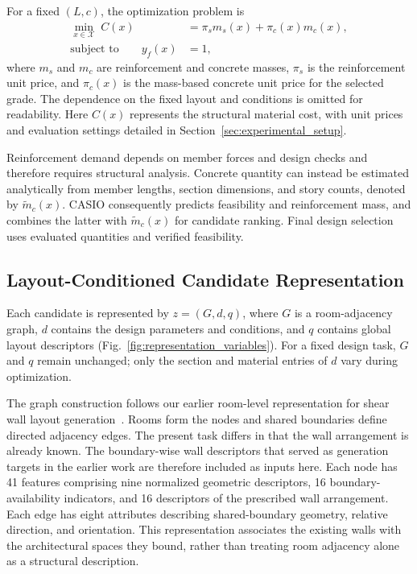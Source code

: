 For a fixed $(L,c)$, the optimization problem is
\begin{equation}
\begin{aligned}
\min_{x\in\mathcal{X}}\; C(x)&=\pi_s m_s(x)+\pi_c(x)m_c(x),\\
\text{subject to}\qquad y_f(x)&=1,
\end{aligned}
\label{eq:optimization_problem}
\end{equation}
where $m_s$ and $m_c$ are reinforcement and concrete masses, $\pi_s$ is the reinforcement unit price, and $\pi_c(x)$ is the mass-based concrete unit price for the selected grade. The dependence on the fixed layout and conditions is omitted for readability. Here $C(x)$ represents the structural material cost, with unit prices and evaluation settings detailed in Section~\ref{sec:experimental_setup}.

Reinforcement demand depends on member forces and design checks and therefore requires structural analysis. Concrete quantity can instead be estimated analytically from member lengths, section dimensions, and story counts, denoted by $\widetilde{m}_c(x)$. CASIO consequently predicts feasibility and reinforcement mass, and combines the latter with $\widetilde{m}_c(x)$ for candidate ranking. Final design selection uses evaluated quantities and verified feasibility.

\subsection{Layout-Conditioned Candidate Representation}
\label{subsec:layout_parameter_model}

Each candidate is represented by $z=(G,d,q)$, where $G$ is a room-adjacency graph, $d$ contains the design parameters and conditions, and $q$ contains global layout descriptors (Fig.~\ref{fig:representation_variables}). For a fixed design task, $G$ and $q$ remain unchanged; only the section and material entries of $d$ vary during optimization.

The graph construction follows our earlier room-level representation for shear wall layout generation~\cite{LengRoomGNN2026}. Rooms form the nodes and shared boundaries define directed adjacency edges. The present task differs in that the wall arrangement is already known. The boundary-wise wall descriptors that served as generation targets in the earlier work are therefore included as inputs here. Each node has 41 features comprising nine normalized geometric descriptors, 16 boundary-availability indicators, and 16 descriptors of the prescribed wall arrangement. Each edge has eight attributes describing shared-boundary geometry, relative direction, and orientation. This representation associates the existing walls with the architectural spaces they bound, rather than treating room adjacency alone as a structural description.

